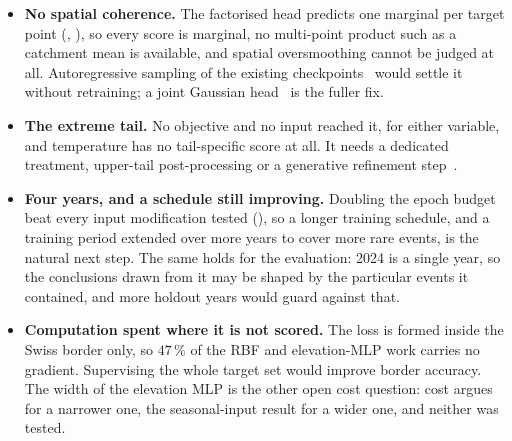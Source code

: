 \begin{itemize}
\item \textbf{No spatial coherence.} The factorised head predicts one marginal per target point
(, ), so every score is marginal, no
multi-point product such as a catchment mean is available, and spatial oversmoothing cannot be
judged at all. Autoregressive sampling of the existing checkpoints~\cite{bruinsma2023arcnp} would
settle it without retraining; a joint Gaussian head~\cite{andersson2023convgnp} is the fuller fix.

\item \textbf{The extreme tail.} No objective and no input reached it, for either variable, and
temperature has no tail-specific score at all. It needs a dedicated treatment, upper-tail
post-processing or a generative refinement step~\cite{harris2022generative, mardani2025corrdiff}.

\item \textbf{Four years, and a schedule still improving.} Doubling the epoch budget beat every
input modification tested (), so a longer training schedule, and a training period extended over more years to cover more rare events, is the natural next step. The same holds for the evaluation: 2024 is a single year, so the conclusions drawn from it may be shaped by the particular events it contained, and more holdout years would guard against that.

\item \textbf{Computation spent where it is not scored.} The loss is formed inside the Swiss border
only, so $47\,\%$ of the RBF and elevation-MLP work carries no gradient. Supervising the whole target set would improve border accuracy. The width of the elevation MLP is the other open cost question: cost argues for a narrower
one, the seasonal-input result for a wider one, and neither was tested.


\end{itemize}
